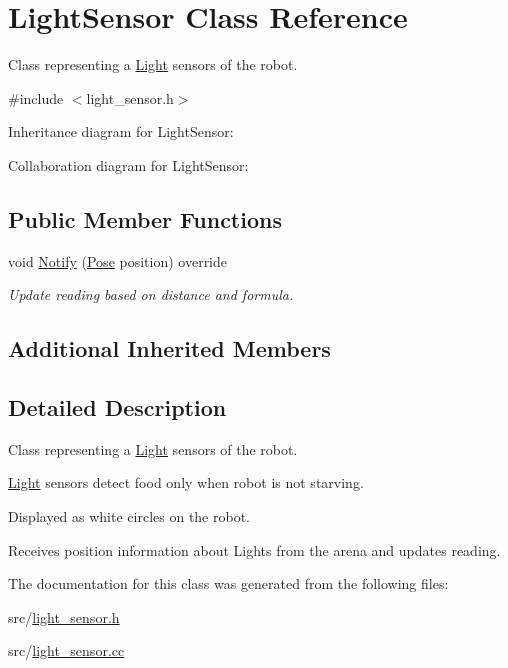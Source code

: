 \hypertarget{classLightSensor}{}\section{Light\+Sensor Class Reference}
\label{classLightSensor}


Class representing a \hyperlink{classLight}{Light} sensors of the robot.  




{\ttfamily \#include $<$light\+\_\+sensor.\+h$>$}



Inheritance diagram for Light\+Sensor\+:


Collaboration diagram for Light\+Sensor\+:
\subsection*{Public Member Functions}
\begin{DoxyCompactItemize}
\item 
void \hyperlink{classLightSensor_af3a6fbed8815ac955f6b8201cf9c9f38}{Notify} (\hyperlink{structPose}{Pose} position) override\hypertarget{classLightSensor_af3a6fbed8815ac955f6b8201cf9c9f38}{}\label{classLightSensor_af3a6fbed8815ac955f6b8201cf9c9f38}

\begin{DoxyCompactList}\small\item\em Update reading based on distance and formula. \end{DoxyCompactList}\end{DoxyCompactItemize}
\subsection*{Additional Inherited Members}


\subsection{Detailed Description}
Class representing a \hyperlink{classLight}{Light} sensors of the robot. 

\hyperlink{classLight}{Light} sensors detect food only when robot is not starving.

Displayed as white circles on the robot.

Receives position information about Lights from the arena and updates reading. 

The documentation for this class was generated from the following files\+:\begin{DoxyCompactItemize}
\item 
src/\hyperlink{light__sensor_8h}{light\+\_\+sensor.\+h}\item 
src/\hyperlink{light__sensor_8cc}{light\+\_\+sensor.\+cc}\end{DoxyCompactItemize}
